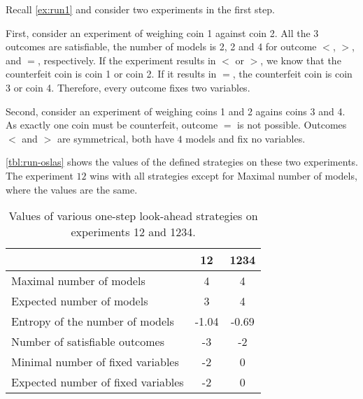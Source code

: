\begin{example}
Recall \autoref{ex:run1} and consider two experiments in the first step.

First, consider an experiment of weighing coin 1 against coin 2.
All the 3 outcomes are satisfiable, the number of models is
  2, 2 and 4 for outcome $<$, $>$, and $=$, respectively.
If the experiment results in $<$ or $>$, we know that the counterfeit coin
is coin 1 or coin 2. If it results in $=$, the counterfeit coin is coin 3 or coin 4.
Therefore, every outcome fixes two variables.

Second, consider an experiment of weighing coins 1 and 2 agains coins 3 and 4.
As exactly one coin must be counterfeit, outcome $=$ is not possible.
Outcomes $<$ and $>$ are symmetrical, both have $4$ models and fix no variables.

\autoref{tbl:run-oslas} shows the values of the defined
  strategies on these two experiments.
The experiment $12$ wins with all strategies except for Maximal number of models,
  where the values are the same.
\begin{table}[ht]
\begin{center}
\begin{tabular}{l|cc}
& 12 & 1234 \\\hline
Maximal number of models & 4 & 4 \\
Expected number of models & 3 & 4 \\
Entropy of the number of models & -1.04 & -0.69 \\
Number of satisfiable outcomes & -3 & -2 \\
Minimal number of fixed variables & -2 & 0 \\
Expected number of fixed variables & -2 & 0 \\
\end{tabular}
\caption{Values of various one-step look-ahead strategies on experiments 12 and 1234.}
\label{tbl:run-oslas}
\end{center}
\end{table}

\end{example}




